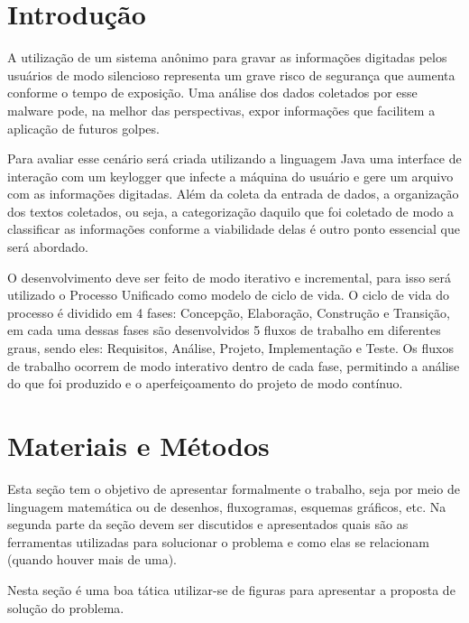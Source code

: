 \documentclass[article,submit,moreauthors,pdftex]{Definitions/mdpi}
\begin{document}
\section{Introdução}
A utilização de um sistema anônimo para gravar as informações digitadas pelos usuários de modo silencioso representa um grave risco de segurança que aumenta conforme o tempo de exposição. Uma análise dos dados coletados por esse malware pode, na melhor das perspectivas, expor informações que facilitem a aplicação de futuros golpes.

Para avaliar esse cenário será criada utilizando a linguagem Java uma interface de interação com um keylogger que infecte a máquina do usuário e gere um arquivo com as informações digitadas. Além da coleta da entrada de dados, a organização dos textos coletados, ou seja, a categorização daquilo que foi coletado de modo a classificar as informações conforme a viabilidade delas é outro ponto essencial que será abordado.

O desenvolvimento deve ser feito de modo iterativo e incremental, para isso será utilizado o Processo Unificado como modelo de ciclo de vida. O ciclo de vida do processo é dividido em 4 fases: Concepção, Elaboração, Construção e Transição, em cada uma dessas fases são desenvolvidos 5 fluxos de trabalho em diferentes graus, sendo eles: Requisitos, Análise, Projeto, Implementação e Teste. Os fluxos de trabalho ocorrem de modo interativo dentro de cada fase, permitindo a análise do que foi produzido e o aperfeiçoamento do projeto de modo contínuo. 




	\section{Materiais e Métodos}
	
	Esta seção tem o objetivo de apresentar formalmente o trabalho, seja por meio de linguagem matemática ou de desenhos, fluxogramas, esquemas gráficos, etc. Na segunda parte da seção devem ser discutidos e apresentados quais são as ferramentas utilizadas para solucionar o problema e como elas se relacionam (quando houver mais de uma).
	
	Nesta seção é uma boa tática utilizar-se de figuras para apresentar a proposta de solução do problema.
	
\end{document}
